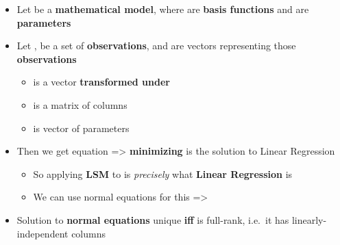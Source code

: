 \begin{itemize}

  \item
        Let  be a
        \textbf{mathematical model}, where  are \textbf{basis
          functions} and  are \textbf{parameters}
  \item
        Let ,  be a
        set of \textbf{observations}, and
         are vectors
        representing those \textbf{observations}

        \begin{itemize}

          \item
                 is
                a vector \textbf{transformed under} 
          \item
                is a matrix of columns
          \item
                 is vector of
                parameters
        \end{itemize}
  \item
        Then we get equation  =\textgreater{}
        \textbf{minimizing}
         is the
        solution to Linear Regression

        \begin{itemize}

          \item
                So applying \textbf{LSM} to  is
                \emph{precisely} what \textbf{Linear Regression} is
          \item
                We can use normal equations for this =\textgreater{}
        \end{itemize}
  \item
        Solution to \textbf{normal equations} unique \textbf{iff}  is
        full-rank, i.e.~it has linearly-independent columns
\end{itemize}

